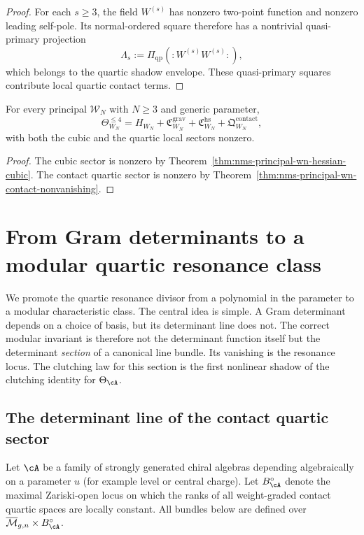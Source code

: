 \begin{proof}
For each $s\ge 3$, the field $W^{(s)}$ has nonzero two-point function and nonzero leading self-pole. Its normal-ordered square therefore has a nontrivial quasi-primary projection
\[
\Lambda_s:=\Pi_{\mathrm{qp}}(:W^{(s)}W^{(s)}:),
\]
which belongs to the quartic shadow envelope. These quasi-primary squares contribute local quartic contact terms.\qedhere
\end{proof}

\begin{corollary}
\label{cor:nms-principal-wn-mixed}
For every principal $\mathcal W_N$ with $N\ge 3$ and generic parameter,
\[
\Theta_{W_N}^{\le 4}
=
H_{W_N}+\mathfrak C^{\mathrm{grav}}_{W_N}+\mathfrak C^{\mathrm{hs}}_{W_N}+\mathfrak Q^{\mathrm{contact}}_{W_N},
\]
with both the cubic and the quartic local sectors nonzero.
\end{corollary}

\begin{proof}
The cubic sector is nonzero by Theorem~\ref{thm:nms-principal-wn-hessian-cubic}. The contact quartic sector is nonzero by Theorem~\ref{thm:nms-principal-wn-contact-nonvanishing}.\qedhere
\end{proof}

\section{From Gram determinants to a modular quartic resonance class}
\label{sec:nms-modular-resonance-class}

We promote the quartic resonance divisor from a polynomial in the parameter to a modular characteristic class. The central idea is simple. A Gram determinant depends on a choice of basis, but its determinant line does not. The correct modular invariant is therefore not the determinant function itself but the determinant \emph{section} of a canonical line bundle. Its vanishing is the resonance locus. The clutching law for this section is the first nonlinear shadow of the clutching identity for $\Theta_{\cA}$.

\subsection{The determinant line of the contact quartic sector}
\label{subsec:nms-determinant-line}

\begin{definition}
\label{def:nms-generic-parameter-locus}
Let $\cA$ be a family of strongly generated chiral algebras depending algebraically on a parameter $u$ (for example level or central charge). Let $B_{\cA}^{\circ}$ denote the maximal Zariski-open locus on which the ranks of all weight-graded contact quartic spaces are locally constant. All bundles below are defined over $\overline{\mathcal M}_{g,n}\times B_{\cA}^{\circ}$.
\end{definition}

